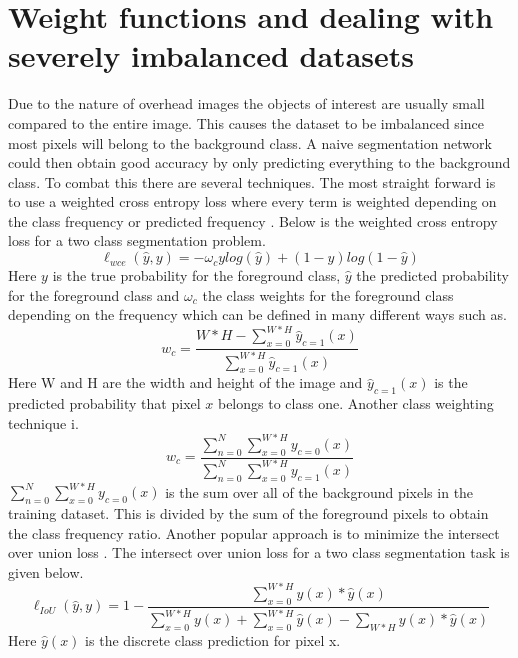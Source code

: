 \documentclass{kththesis}
\begin{document}
\section{Weight functions and dealing with severely imbalanced datasets}
Due to the nature of overhead images the objects of interest are usually small compared to the entire image. This causes the dataset to be imbalanced since most pixels will belong to the background class. A naive segmentation network could then obtain good accuracy by only predicting everything to the background class. To combat this there are several techniques. The most straight forward is to use a weighted cross entropy loss where every term is weighted depending on the class frequency or predicted frequency \parencite{sudre_generalised_2017}. Below is the weighted cross entropy loss for a two class segmentation problem.
\begin{equation}
\ell_{wce}(\hat{y}, y)=-\omega_cylog(\hat{y}) + (1-y)log(1-\hat{y})
\end{equation}
Here $y$ is the true probability for the foreground class, $\hat{y}$ the predicted probability for the foreground class and $\omega_c$ the class weights for the foreground class depending on the frequency which can be defined in many different ways such as. 
\begin{equation}\label{eq:wc1}
w_c=\frac{W*H - \sum_{x=0}^{W*H} \hat{y}_{c=1}(x)}{\sum_{x=0}^{W*H} \hat{y}_{c=1}(x)}
\end{equation}
Here W and H are the width and height of the image and $\hat{y}_{c=1}(x)$ is the predicted probability that pixel $x$ belongs to class one. Another class weighting technique i.
\begin{equation}\label{eq:wc2}
w_c=\frac{\sum_{n=0}^{N} \sum_{x=0}^{W*H} y_{c=0}(x)}{\sum_{n=0}^{N} \sum_{x=0}^{W*H} y_{c=1}(x)}
\end{equation}
$\sum_{n=0}^{N} \sum_{x=0}^{W*H} y_{c=0}(x)$ is the sum over all of the background pixels in the training dataset. This is divided by the sum of the foreground pixels to obtain the class frequency ratio. Another popular approach is to minimize the intersect over union loss \parencite{yu_unitbox:_2016, rahman_optimizing_2016}. The intersect over union loss for a two class segmentation task is given below.
\begin{equation}
\ell_{IoU}(\hat{y}, y)= 1 - \frac{ \sum_{x=0}^{W*H} y(x)*\hat{y}(x) }{ \sum_{x=0}^{W*H} y(x) + \sum_{x=0}^{W*H} \hat{y}(x) - \sum_{W*H} y(x) * \hat{y}(x)}
\end{equation}
Here $\hat{y}(x)$ is the discrete class prediction for pixel x.\\
\end{document}
